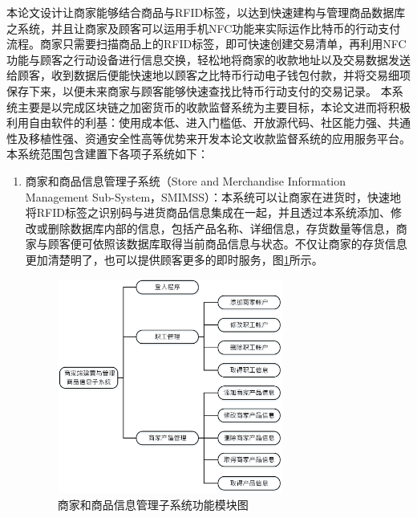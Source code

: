 	本论文设计让商家能够结合商品与RFID标签，以达到快速建构与管理商品数据库之系统，并且让商家及顾客可以运用手机NFC功能来实际运作比特币的行动支付流程。商家只需要扫描商品上的RFID标签，即可快速创建交易清单，再利用NFC功能与顾客之行动设备进行信息交换，轻松地将商家的收款地址以及交易数据发送给顾客，收到数据后便能快速地以顾客之比特币行动电子钱包付款，并将交易细项保存下来，以便未来商家与顾客能够快速查找比特币行动支付的交易记录。
	本系统主要是以完成区块链之加密货币的收款监督系统为主要目标，本论文进而将积极利用自由软件的利基：使用成本低、进入门槛低、开放源代码、社区能力强、共通性及移植性强、资通安全性高等优势来开发本论文收款监督系统的应用服务平台。本系统范围包含建置下各项子系统如下：
		\begin{enumerate}
		\item 商家和商品信息管理子系统（Store and Merchandise Information Management Sub-System，SMIMSS）：本系统可以让商家在进货时，快速地将RFID标签之识别码与进货商品信息集成在一起，并且透过本系统添加、修改或删除数据库内部的信息，包括产品名称、详细信息，存货数量等信息，商家与顾客便可依照该数据库取得当前商品信息与状态。不仅让商家的存货信息更加清楚明了，也可以提供顾客更多的即时服务，图\ref{model1}所示。

			\begin{figure}[!htbp]
			\centering
			\includegraphics[width = 0.7\textwidth]{model1.jpg}
			\caption{商家和商品信息管理子系统功能模块图}\label{model1}
			\end{figure}




\end{enumerate}
